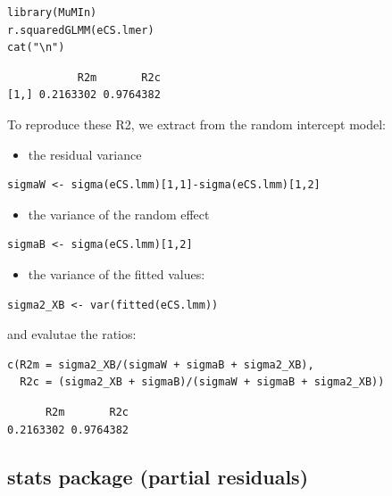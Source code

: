 \documentclass[12pt]{article}
\begin{document}
\lstset{language=r,label= ,caption= ,captionpos=b,numbers=none}
\begin{lstlisting}
library(MuMIn)
r.squaredGLMM(eCS.lmer)
cat("\n")
\end{lstlisting}

\begin{verbatim}
           R2m       R2c
[1,] 0.2163302 0.9764382
\end{verbatim}


To reproduce these R2, we extract from the random intercept model:
\begin{itemize}
\item the residual variance
\end{itemize}
\lstset{language=r,label= ,caption= ,captionpos=b,numbers=none}
\begin{lstlisting}
sigmaW <- sigma(eCS.lmm)[1,1]-sigma(eCS.lmm)[1,2]
\end{lstlisting}

\begin{itemize}
\item the variance of the random effect
\end{itemize}
\lstset{language=r,label= ,caption= ,captionpos=b,numbers=none}
\begin{lstlisting}
sigmaB <- sigma(eCS.lmm)[1,2]
\end{lstlisting}

\begin{itemize}
\item the variance of the fitted values:
\end{itemize}
\lstset{language=r,label= ,caption= ,captionpos=b,numbers=none}
\begin{lstlisting}
sigma2_XB <- var(fitted(eCS.lmm))
\end{lstlisting}

and evalutae the ratios:
\lstset{language=r,label= ,caption= ,captionpos=b,numbers=none}
\begin{lstlisting}
c(R2m = sigma2_XB/(sigmaW + sigmaB + sigma2_XB),
  R2c = (sigma2_XB + sigmaB)/(sigmaW + sigmaB + sigma2_XB))
\end{lstlisting}

\begin{verbatim}
      R2m       R2c 
0.2163302 0.9764382
\end{verbatim}

\subsection{stats package (partial residuals)}
\label{sec:orgab45d96}
\end{document}
